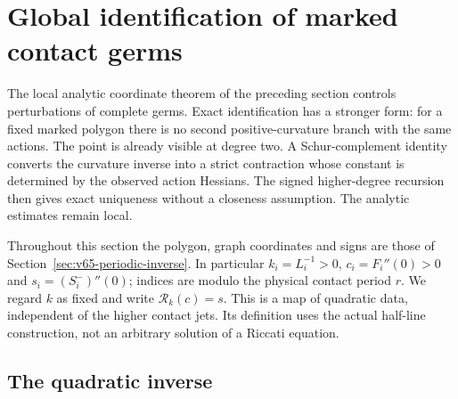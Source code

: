 \section{Global identification of marked contact germs}
\label{sec:v66-global-contact}

The local analytic coordinate theorem of the preceding section controls
perturbations of complete germs.  Exact identification has a stronger
form: for a fixed marked polygon there is no second positive-curvature
branch with the same actions.  The point is already visible at degree
two.  A Schur-complement identity converts the curvature inverse into a
strict contraction whose constant is determined by the observed action
Hessians.  The signed higher-degree recursion then gives exact uniqueness
without a closeness assumption.  The analytic estimates remain local.

Throughout this section the polygon, graph coordinates and signs are
those of Section~\ref{sec:v65-periodic-inverse}.  In particular
$k_i=L_i^{-1}>0$, $c_i=F_i''(0)>0$ and $s_i=(S_i^-)''(0)$;
indices are modulo the physical contact period $r$.  We regard $k$ as
fixed and write $\mathcal R_k(c)=s$.  This is a map of quadratic data,
independent of the higher contact jets.  Its definition uses the actual
half-line construction, not an arbitrary solution of a Riccati equation.

\subsection{The quadratic inverse}

